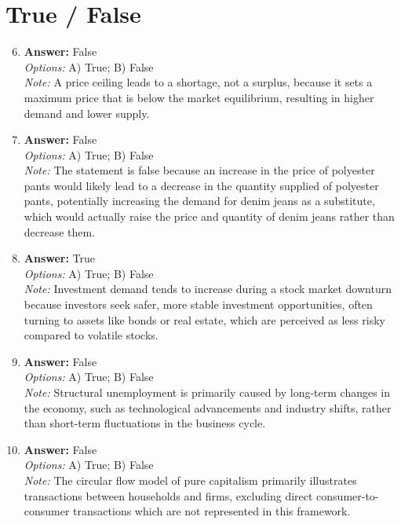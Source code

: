 \documentclass[12pt]{article}
\begin{document}
\section*{True / False}
\begin{enumerate}[label=\arabic*.]
\setcounter{enumi}{5}
\item \textbf{Answer:} False
\\ \textit{Options:} A) True; B) False
\\ \textit{Note:} A price ceiling leads to a shortage, not a surplus, because it sets a maximum price that is below the market equilibrium, resulting in higher demand and lower supply.
\item \textbf{Answer:} False
\\ \textit{Options:} A) True; B) False
\\ \textit{Note:} The statement is false because an increase in the price of polyester pants would likely lead to a decrease in the quantity supplied of polyester pants, potentially increasing the demand for denim jeans as a substitute, which would actually raise the price and quantity of denim jeans rather than decrease them.
\item \textbf{Answer:} True
\\ \textit{Options:} A) True; B) False
\\ \textit{Note:} Investment demand tends to increase during a stock market downturn because investors seek safer, more stable investment opportunities, often turning to assets like bonds or real estate, which are perceived as less risky compared to volatile stocks.
\item \textbf{Answer:} False
\\ \textit{Options:} A) True; B) False
\\ \textit{Note:} Structural unemployment is primarily caused by long-term changes in the economy, such as technological advancements and industry shifts, rather than short-term fluctuations in the business cycle.
\item \textbf{Answer:} False
\\ \textit{Options:} A) True; B) False
\\ \textit{Note:} The circular flow model of pure capitalism primarily illustrates transactions between households and firms, excluding direct consumer-to-consumer transactions which are not represented in this framework.
\end{enumerate}
\end{document}

